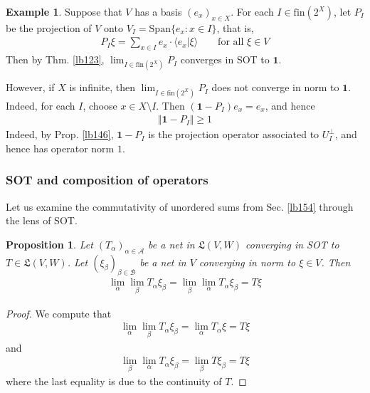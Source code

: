 \documentclass[12pt,b5paper,notitlepage]{article}
\theoremstyle{definition}
\newtheorem{eg}[df]{Example}
\theoremstyle{plain}
\newtheorem{pp}[df]{Proposition}
\newcommand{\fk}{\mathfrak}
\newcommand{\idt}{\mathbf{1}}
\newcommand{\Span}{\mathrm{Span}}
\newcommand{\bk}[1]{\langle {#1}\rangle}
\newcommand{\scr}{\mathscr}
\newcommand{\fin}{\mathrm{fin}}
\newcommand{\hqed}{\hfill\qedsymbol}
\numberwithin{equation}{section}
\begin{document}
\begin{eg}\label{lb157}
Suppose that $V$ has a basis $(e_x)_{x\in X}$. For each $I\in\fin(2^X)$, let $P_I$ be the projection of $V$ onto $V_I=\Span\{e_x:x\in I\}$, that is,
\begin{align*}
P_I\xi=\sum_{x\in I}e_x\cdot\bk{e_x|\xi}\qquad\text{for all }\xi\in V
\end{align*}
Then by Thm. \ref{lb123}, $\lim_{I\in\fin(2^X)}P_I$ converges in SOT to $\idt$. 

However, if $X$ is infinite, then $\lim_{I\in\fin(2^X)}P_I$ does not converge in norm to $\idt$. Indeed, for each $I$, choose $x\in X\setminus I$. Then $(\idt-P_I)e_x=e_x$, and hence
\begin{align*}
\Vert\idt-P_I\Vert\geq 1
\end{align*}
Indeed, by Prop. \ref{lb146}, $\idt-P_I$ is the projection operator associated to $U_I^\perp$, and hence has operator norm $1$.  \hqed
\end{eg}




\subsubsection{SOT and composition of operators}


Let us examine the commutativity of unordered sums from Sec. \ref{lb154} through the lens of SOT.


\begin{pp}\label{lb156}
Let $(T_\alpha)_{\alpha\in\scr A}$ be a net in $\fk L(V,W)$ converging in SOT to $T\in\fk L(V,W)$. Let $(\xi_\beta)_{\beta\in\scr B}$ be a net in $V$ converging in norm to $\xi\in V$. Then 
\begin{align}
\lim_\alpha \lim_\beta T_\alpha \xi_\beta=\lim_\beta\lim_\alpha T_\alpha \xi_\beta=T\xi
\end{align}
\end{pp}

\begin{proof}
We compute that
\begin{align*}
\lim_\alpha\lim_\beta T_\alpha \xi_\beta=\lim_\alpha T_\alpha \xi=T\xi
\end{align*}
and
\begin{align*}
\lim_\beta\lim_\alpha T_\alpha \xi_\beta=\lim_\beta T\xi_\beta=T\xi
\end{align*}
where the last equality is due to the continuity of $T$.
\end{proof}
\end{document}
